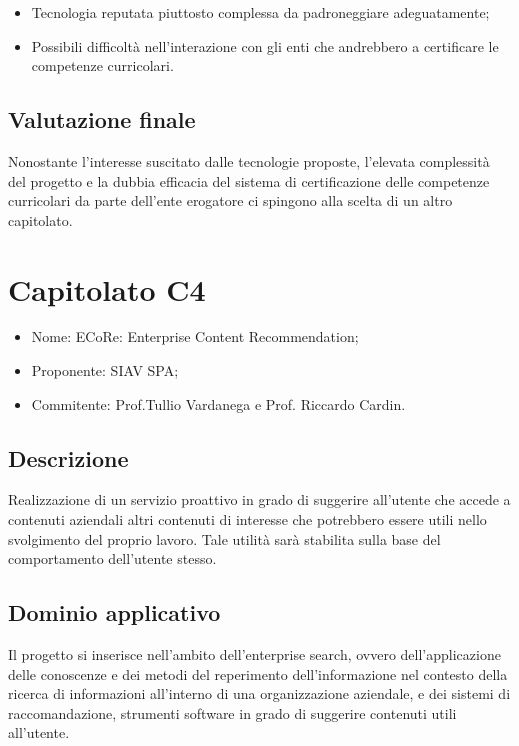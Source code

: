\documentclass[openany,12pt,a4paper]{report}
\begin{document}
\begin{itemize}
    \item Tecnologia reputata piuttosto complessa da padroneggiare adeguatamente;
    
    \item Possibili difficoltà nell'interazione con gli enti che andrebbero a certificare le competenze curricolari.
\end{itemize}

\subsection{Valutazione finale}

Nonostante l'interesse suscitato dalle tecnologie proposte, l'elevata complessità del progetto e la dubbia efficacia del sistema di certificazione delle competenze curricolari da parte dell'ente erogatore ci spingono alla scelta di un altro capitolato.


\section{Capitolato C4}

\begin{itemize}
    \item{Nome:} ECoRe: Enterprise Content Recommendation;
    \item{Proponente:} SIAV SPA;
    \item{Commitente:} Prof.Tullio Vardanega e Prof. Riccardo Cardin.
\end{itemize}

\subsection{Descrizione}

Realizzazione di un servizio proattivo in grado di suggerire all’utente che accede a contenuti aziendali altri contenuti di interesse che potrebbero essere utili nello svolgimento del proprio lavoro. Tale utilità sarà stabilita sulla base del comportamento dell’utente stesso.

\subsection{Dominio applicativo}

Il progetto si inserisce nell'ambito dell'enterprise search, ovvero dell’applicazione delle conoscenze e dei metodi del reperimento dell’informazione nel contesto della ricerca di informazioni all’interno di una organizzazione aziendale, e dei sistemi di raccomandazione, strumenti software in grado di suggerire contenuti utili all’utente.
\end{document}
